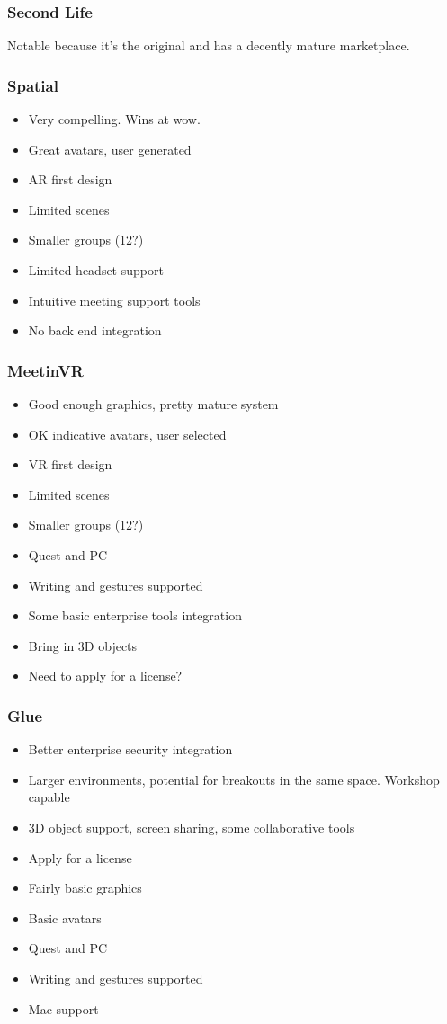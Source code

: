 \subsubsection{Second Life}
Notable because it's the original and has a decently mature marketplace.
\lipsum[50]
\subsubsection{Spatial}
\begin{itemize}
\item Very compelling. Wins at wow.
\item Great avatars, user generated
\item AR first design
\item Limited scenes
\item Smaller groups (12?)
\item Limited headset support
\item Intuitive meeting support tools
\item No back end integration
\end{itemize}
\subsubsection{MeetinVR}
\begin{itemize}
\item Good enough graphics, pretty mature system
\item OK indicative avatars, user selected
\item VR first design
\item Limited scenes
\item Smaller groups (12?)
\item Quest and PC
\item Writing and gestures supported
\item Some basic enterprise tools integration
\item Bring in 3D objects
\item Need to apply for a license?
\end{itemize}
\subsubsection{Glue}
\begin{itemize}
\item Better enterprise security integration
\item Larger environments, potential for breakouts in the same space. Workshop capable
\item 3D object support, screen sharing, some collaborative tools
\item Apply for a license
\item Fairly basic graphics
\item Basic avatars
\item Quest and PC
\item Writing and gestures supported
\item Mac support
\end{itemize}
